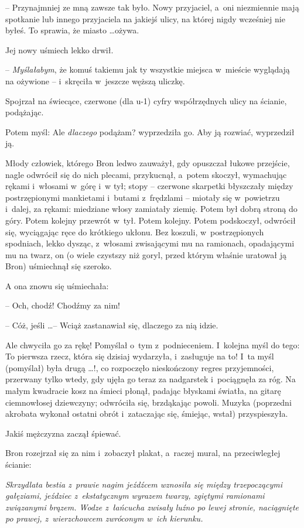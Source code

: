 \documentclass[oneside,polish,11pt,rmheadings]{mwbk}
\begin{document}
-- Przynajmniej ze mną zawsze tak było. Nowy przyjaciel, a~oni niezmiennie mają spotkanie lub innego przyjaciela na jakiejś ulicy, na której nigdy wcześniej nie byłeś. To sprawia, że miasto \ldots  ożywa. 

Jej nowy uśmiech lekko drwił. 

-- \textit{Myślałabym}, że komuś takiemu jak ty wszystkie miejsca w~mieście wyglądają na ożywione -- i~skręciła w~jeszcze węższą uliczkę. 

Spojrzał na świecące, czerwone (dla u-1) cyfry współrzędnych ulicy na ścianie, podążając. 

 Potem myśl: Ale \textit{dlaczego }podążam? wyprzedziła go. Aby ją rozwiać, wyprzedził ją. 

Młody człowiek, którego Bron ledwo zauważył, gdy opuszczał łukowe przejście, nagle odwrócił się do nich plecami, przykucnął, a~potem skoczył, wymachując rękami i~włosami w~górę i~w tył; stopy -- czerwone skarpetki błyszczały między postrzępionymi mankietami i~butami z~frędzlami -- miotały się w~powietrzu i~dalej, za rękami: miedziane włosy zamiatały ziemię. Potem był dobrą stroną do góry. Potem kolejny przewrót w~tył. Potem kolejny. Potem podskoczył, odwrócił się, wyciągając ręce do krótkiego ukłonu. Bez koszuli, w~postrzępionych spodniach, lekko dysząc, z~włosami zwisającymi mu na ramionach, opadającymi mu na twarz, on (o wiele czystszy niż goryl, przed którym właśnie uratował ją Bron) uśmiechnął się szeroko. 

A ona znowu się uśmiechała: 

-- Och, chodź! Chodźmy za nim! 

-- Cóż, jeśli \ldots  -- Wciąż zastanawiał się, dlaczego za nią idzie. 

Ale chwyciła go za rękę! Pomyślał o~tym z~podnieceniem. I~kolejna myśl do tego: To pierwsza rzecz, która się dzisiaj wydarzyła, i~zasługuje na to! I~ta myśl (pomyślał) była drugą \ldots  !, co rozpoczęło nieskończony regres przyjemności, przerwany tylko wtedy, gdy ujęła go teraz za nadgarstek i~pociągnęła za róg. Na małym kwadracie kosz na śmieci płonął, padając błyskami światła, na gitarę ciemnowłosej dziewczyny; odwróciła się, brzdąkając powoli. Muzyka (poprzedni akrobata wykonał ostatni obrót i~zataczając się, śmiejąc, wstał) przyspieszyła. 

Jakiś mężczyzna zaczął śpiewać. 

Bron rozejrzał się za nim i~zobaczył plakat, a~raczej mural, na przeciwległej ścianie: 

\textit{Skrzydlata bestia z~prawie nagim jeźdźcem wznosiła się między trzepoczącymi gałęziami, jeździec z~ekstatycznym wyrazem twarzy, zgiętymi ramionami związanymi brązem. Wodze z~łańcucha zwisały luźno po lewej stronie, naciągnięte po prawej, z~wierzchowcem zwróconym w~ich kierunku. }
\end{document}
